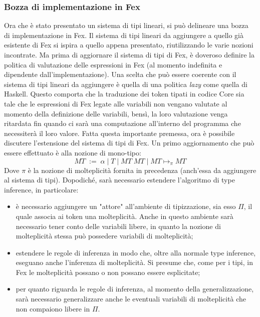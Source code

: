 \documentclass[10pt,a4paper]{article}
\begin{document}
\subsubsection{Bozza di implementazione in Fex}
Ora che è stato presentato un sistema di tipi lineari, si può delineare una bozza di implementazione in Fex.
Il sistema di tipi lineari da aggiungere a quello già esistente di Fex si ispira a quello appena presentato,
riutilizzando le varie nozioni incontrate. Ma prima di aggiornare il sistema di tipi di Fex, è doveroso definire
la politica di valutazione delle espressioni in Fex (al momento indefinita e dipendente dall'implementazione).
Una scelta che può essere coerente con il sistema di tipi lineari da aggiungere è quella di una politica \textit{lazy}
come quella di Haskell. Questo comporta che la traduzione dei token tipati in codice Core sia tale che le espressioni
di Fex legate alle variabili non vengano valutate al momento della definizione delle variabili, bensì, la loro
valutazione venga ritardata fin quando ci sarà una computazione all'interno del programma che necessiterà il loro
valore. Fatta questa importante premessa, ora è possibile discutere l'estensione del sistema di tipi di Fex.
Un primo aggiornamento che può essere effettuato è alla nozione di mono-tipo:
\[ MT \; := \; \alpha \; | \; T \; | \; MT \; MT \; | \; MT \mapsto_{\pi} MT \]
Dove $ \pi $ è la nozione di molteplicità fornita in precedenza (anch'essa da aggiungere al sistema di tipi).
Dopodiché, sarà necessario estendere l'algoritmo di type inference, in particolare:
\begin{itemize}
    \item è necessario aggiungere un "attore" all'ambiente di tipizzazione, sia esso $ \Pi $, il quale associa ai
    token una molteplicità. Anche in questo ambiente sarà necessario tener conto delle variabili libere, in quanto
    la nozione di molteplicità stessa può possedere variabili di molteplicità;
    \item estendere le regole di inferenza in modo che, oltre alla normale type inference, eseguano anche l'inferenza
    di molteplicità. Si presume che, come per i tipi, in Fex le molteplicità possano o non possano essere esplicitate;
    \item per quanto riguarda le regole di inferenza, al momento della generalizzazione, sarà necessario generalizzare
    anche le eventuali variabili di molteplicità che non compaiono libere in $ \Pi $.
\end{itemize}
\end{document}
